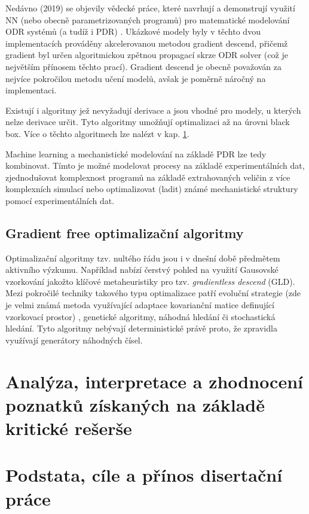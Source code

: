 Nedávno (2019) se objevily vědecké práce, které navrhují a demonstrují využití
NN (nebo obecně parametrizovaných programů) pro matematické modelování ODR
systémů (a tudíž i PDR) \cite{diffEqFlux2019, chen2018neural}. Ukázkové modely
byly v těchto dvou implementacích prováděny akcelerovanou metodou gradient
descend, přičemž gradient byl určen algoritmickou zpětnou propagací skrze ODR
solver (což je největším přínosem těchto prací). Gradient descend je obecně
považován za nejvíce pokročilou metodu učení modelů, avšak je poměrně náročný
na implementaci.

Existují i algoritmy jež nevyžadují derivace a jsou vhodné pro modely, u
kterých nelze derivace určit. Tyto algoritmy umožňují optimalizaci až na úrovni
black box. Více o těchto algoritmech lze nalézt v kap. \ref{sec:opt_alg}.

Machine learning a mechanistické modelování na základě PDR lze tedy kombinovat.
Tímto je možné modelovat procesy na základě experimentálních dat, zjednodušovat
komplexnost programů na základě extrahovaných veličin z více komplexních
simulací nebo optimalizovat (ladit) známé mechanistické struktury pomocí
experimentálních dat.

\section{Gradient free optimalizační algoritmy}
\label{sec:opt_alg}
Optimalizační algoritmy tzv. nultého řádu jsou i v dnešní době předmětem
aktivního výzkumu. Například \cite{golovin2019gradientless} nabízí čerstvý
pohled na využití Gausovské vzorkování jakožto klíčové metaheuristiky pro
tzv. \textit{gradientless descend} (GLD). Mezi pokročilé techniky takového
typu optimalizace patří evoluční strategie (zde je velmi známá metoda
využívající adaptace kovarianční matice definující vzorkovací prostor)
, genetické algoritmy, náhodná hledání či stochastická hledání.
Tyto algoritmy nebývají deterministické právě proto, že zpravidla využívají
generátory náhodných čísel.

\chapter{Analýza, interpretace a zhodnocení poznatků získaných na základě
kritické rešerše}
\chapter{Podstata, cíle a přínos disertační práce}
\label{chap:Aims_of_disertation}
